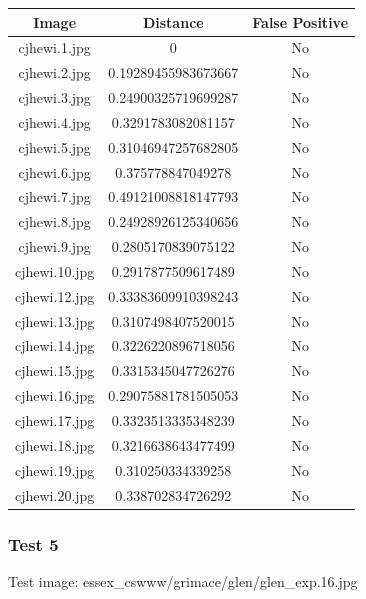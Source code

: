 \documentclass[12pt]{article}
\begin{document}
\begin{center}
\begin{tabular}{ccc}
Image & Distance & False Positive \\
\hline
cjhewi.1.jpg & 0 & No \\
cjhewi.2.jpg & 0.19289455983673667 & No \\
cjhewi.3.jpg & 0.24900325719699287 & No \\
cjhewi.4.jpg & 0.3291783082081157 & No \\
cjhewi.5.jpg & 0.31046947257682805 & No \\
cjhewi.6.jpg & 0.375778847049278 & No \\
cjhewi.7.jpg & 0.49121008818147793 & No \\
cjhewi.8.jpg & 0.24928926125340656 & No \\
cjhewi.9.jpg & 0.2805170839075122 & No \\
cjhewi.10.jpg & 0.2917877509617489 & No \\
cjhewi.12.jpg & 0.33383609910398243 & No \\
cjhewi.13.jpg & 0.3107498407520015 & No \\
cjhewi.14.jpg & 0.3226220896718056 & No \\
cjhewi.15.jpg & 0.3315345047726276 & No \\
cjhewi.16.jpg & 0.29075881781505053 & No \\
cjhewi.17.jpg & 0.3323513335348239 & No \\
cjhewi.18.jpg & 0.3216638643477499 & No \\
cjhewi.19.jpg & 0.310250334339258 & No \\
cjhewi.20.jpg & 0.338702834726292 & No \\
\end{tabular}
\end{center}

\subsubsection{Test 5}
Test image: essex\_cswww/grimace/glen/glen\_exp.16.jpg
\end{document}
